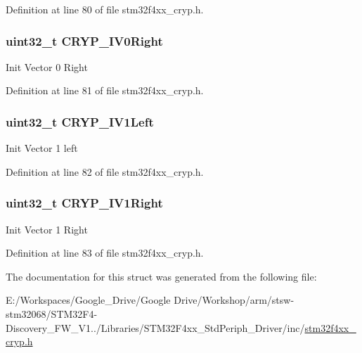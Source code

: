 Definition at line 80 of file stm32f4xx\-\_\-cryp.\-h.

\hypertarget{struct_c_r_y_p___i_v_init_type_def_a161f9d7a7f2b4ab0d0d02f5b3e03b82d}{
\subsubsection[{C\-R\-Y\-P\-\_\-\-I\-V0\-Right}]{\setlength{\rightskip}{0pt plus 5cm}uint32\-\_\-t C\-R\-Y\-P\-\_\-\-I\-V0\-Right}}\label{struct_c_r_y_p___i_v_init_type_def_a161f9d7a7f2b4ab0d0d02f5b3e03b82d}
Init Vector 0 Right 

Definition at line 81 of file stm32f4xx\-\_\-cryp.\-h.

\hypertarget{struct_c_r_y_p___i_v_init_type_def_a5a43719bf281a2f12ac49f9b61852088}{
\subsubsection[{C\-R\-Y\-P\-\_\-\-I\-V1\-Left}]{\setlength{\rightskip}{0pt plus 5cm}uint32\-\_\-t C\-R\-Y\-P\-\_\-\-I\-V1\-Left}}\label{struct_c_r_y_p___i_v_init_type_def_a5a43719bf281a2f12ac49f9b61852088}
Init Vector 1 left 

Definition at line 82 of file stm32f4xx\-\_\-cryp.\-h.

\hypertarget{struct_c_r_y_p___i_v_init_type_def_a9f796973f4e0b2e146fcef98965dc71b}{
\subsubsection[{C\-R\-Y\-P\-\_\-\-I\-V1\-Right}]{\setlength{\rightskip}{0pt plus 5cm}uint32\-\_\-t C\-R\-Y\-P\-\_\-\-I\-V1\-Right}}\label{struct_c_r_y_p___i_v_init_type_def_a9f796973f4e0b2e146fcef98965dc71b}
Init Vector 1 Right 

Definition at line 83 of file stm32f4xx\-\_\-cryp.\-h.



The documentation for this struct was generated from the following file\-:\begin{DoxyCompactItemize}
\item 
E\-:/\-Workspaces/\-Google\-\_\-\-Drive/\-Google Drive/\-Workshop/arm/stsw-\/stm32068/\-S\-T\-M32\-F4-\/\-Discovery\-\_\-\-F\-W\-\_\-\-V1../\-Libraries/\-S\-T\-M32\-F4xx\-\_\-\-Std\-Periph\-\_\-\-Driver/inc/\hyperlink{stm32f4xx__cryp_8h}{stm32f4xx\-\_\-cryp.\-h}\end{DoxyCompactItemize}
